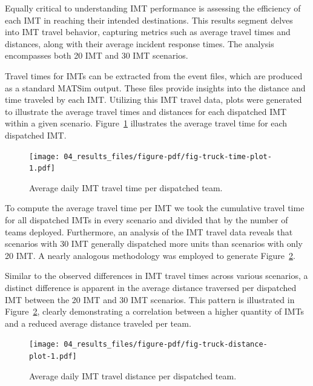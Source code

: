 \documentclass[fancy, oneside, mastersfancy, ms]{byuthesis}
\begin{document}
Equally critical to understanding IMT performance is assessing the
efficiency of each IMT in reaching their intended destinations. This
results segment delves into IMT travel behavior, capturing metrics such
as average travel times and distances, along with their average incident
response times. The analysis encompasses both 20 IMT and 30 IMT
scenarios.

Travel times for IMTs can be extracted from the event files, which are
produced as a standard MATSim output. These files provide insights into
the distance and time traveled by each IMT. Utilizing this IMT travel
data, plots were generated to illustrate the average travel times and
distances for each dispatched IMT within a given scenario.
Figure~\ref{fig-truck-time-plot} illustrates the average travel time for
each dispatched IMT.

\begin{figure}

{\centering \texttt{[image: 04\_results\_files/figure-pdf/fig-truck-time-plot-1.pdf]}

}

\caption{\label{fig-truck-time-plot}Average daily IMT travel time per
dispatched team.}

\end{figure}

To compute the average travel time per IMT we took the cumulative travel
time for all dispatched IMTs in every scenario and divided that by the
number of teams deployed. Furthermore, an analysis of the IMT travel
data reveals that scenarios with 30 IMT generally dispatched more units
than scenarios with only 20 IMT. A nearly analogous methodology was
employed to generate Figure~\ref{fig-truck-distance-plot}.

Similar to the observed differences in IMT travel times across various
scenarios, a distinct difference is apparent in the average distance
traversed per dispatched IMT between the 20 IMT and 30 IMT scenarios.
This pattern is illustrated in Figure~\ref{fig-truck-distance-plot},
clearly demonstrating a correlation between a higher quantity of IMTs
and a reduced average distance traveled per team.

\begin{figure}

{\centering \texttt{[image: 04\_results\_files/figure-pdf/fig-truck-distance-plot-1.pdf]}

}

\caption{\label{fig-truck-distance-plot}Average daily IMT travel
distance per dispatched team.}

\end{figure}
\end{document}
